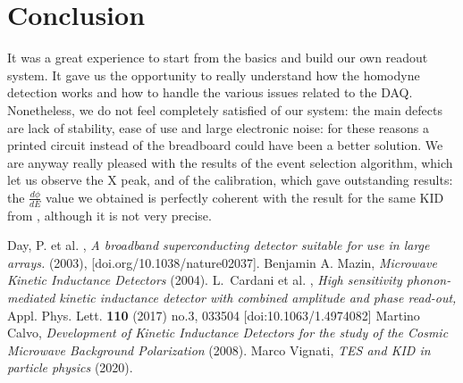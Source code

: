\documentclass[12pt]{article}
\begin{document}
\section{Conclusion}
It was a great experience to start from the basics and build our own readout system. It gave us the opportunity to really understand how the homodyne detection works and how to handle the various issues related to the DAQ. Nonetheless, we do not feel completely satisfied of our system: the main defects are lack of stability, ease of use and large electronic noise: for these reasons a printed circuit instead of the breadboard could have been a better solution. We are anyway really pleased with the results of the event selection algorithm, which let us observe the X peak, and of the calibration, which gave outstanding results: the $\frac{d \phi}{dE}$ value we obtained is perfectly coherent with the result for the same KID from \cite{Cardani}, although it is not very precise.
\begin{thebibliography}{99}
\bibitem{}
Day, P. et al. ,
\textit{A broadband superconducting detector suitable for use in large arrays.} (2003), [doi.org/10.1038/nature02037].
\bibitem{}
Benjamin A. Mazin,
\textit{Microwave Kinetic Inductance Detectors} (2004).
L.~Cardani et al. , \textit{High sensitivity phonon-mediated kinetic inductance detector with combined amplitude and phase read-out,}
Appl. Phys. Lett. \textbf{110} (2017) no.3, 033504
[doi:10.1063/1.4974082]
\bibitem{}
Martino Calvo,
\textit{Development of Kinetic Inductance Detectors for the study of the Cosmic Microwave Background Polarization} (2008).
\bibitem{}
Marco Vignati, 
\textit{TES and KID in particle physics}
(2020).
\end{thebibliography}
\end{document}
